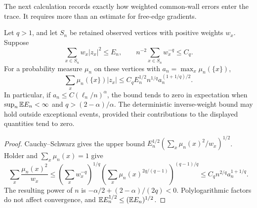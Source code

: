 The next calculation records exactly how weighted common-wall errors
enter the trace.  It requires more than an estimate for free-edge
gradients.

\begin{lemma}\label{t:anchors}
Let $q>1$, and let $S_n$ be retained observed vertices with positive
weights $w_x$.  Suppose
\[
 \sum_{x\in S_n}w_x|z_x|^2\le E_n,
 \qquad n^{-2}\sum_{x\in S_n}w_x^{-q}\le C_q.
\]
For a probability measure $\mu_n$ on these vertices with
$a_n=\max_x\mu_n(\{x\})$,
\begin{equation}\label{t:anchor-rate}
 \sum_x\mu_n(\{x\})|z_x|
 \le C_q E_n^{1/2}n^{1/q}a_n^{(1+1/q)/2}.
\end{equation}
In particular, if $a_n\le C(\ell_n/n)^\alpha$, the bound tends to zero
in expectation when $\sup_n\mathbb E E_n<\infty$ and
$q>(2-\alpha)/\alpha$.  The deterministic inverse-weight bound may hold
outside exceptional events, provided their contributions to the displayed
quantities tend to zero.
\end{lemma}
\begin{proof}
Cauchy--Schwarz gives the upper bound
$E_n^{1/2}(\sum_x\mu_n(x)^2/w_x)^{1/2}$.
Holder and $\sum_x\mu_n(x)=1$ give
\[
 \sum_x\frac{\mu_n(x)^2}{w_x}
 \le \left(\sum_xw_x^{-q}\right)^{1/q}
      \left(\sum_x\mu_n(x)^{2q/(q-1)}\right)^{(q-1)/q}
 \le C_qn^{2/q}a_n^{1+1/q}.
\]
The resulting power of $n$ is
$-\alpha/2+(2-\alpha)/(2q)<0$.  Polylogarithmic factors do not affect
convergence, and $\mathbb E E_n^{1/2}\le(\mathbb E E_n)^{1/2}$.
\end{proof}

